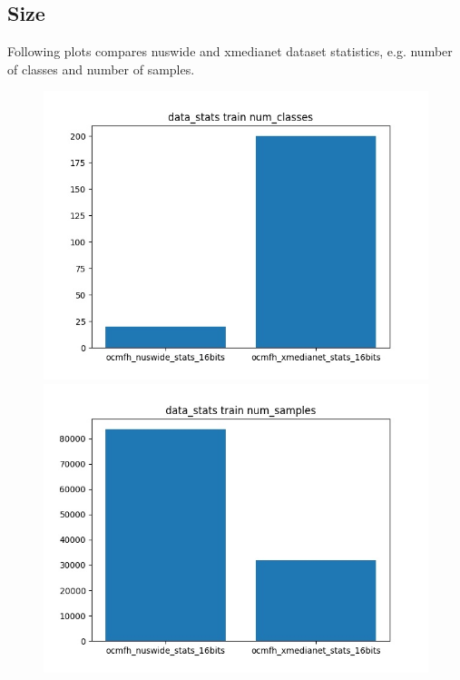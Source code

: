\subsection{Size}
    Following plots compares nuswide and xmedianet dataset statistics, e.g. number of classes and number of samples.
        \begin{figure}[H]
            \begin{minipage}[!h]{0.6\linewidth}
                \centering
                \includegraphics[width=\linewidth]{resultsImages/size/data_stats train num_classes.jpeg}
                \vspace{0.1ex}
                \hspace{0.1ex}
            \end{minipage}
            \begin{minipage}[!h]{0.6\linewidth}
                \centering
                \includegraphics[width=\linewidth]{resultsImages/size/data_stats train num_samples.jpeg}

\end{minipage}
\end{figure}

